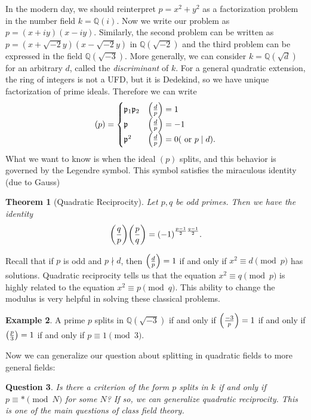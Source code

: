 \documentclass[leqno, openany]{memoir}
\newtheorem{thm}{Theorem}[section]
\newtheorem{quest}[thm]{Question}
\theoremstyle{definition}
\newtheorem{exm}[thm]{Example}
\theoremstyle{remark}
\theoremstyle{plain}
\theoremstyle{definition}
\theoremstyle{remark}
\newcommand{\Q}{\mathbb{Q}}
\newcommand{\mf}[1]{\mathfrak{#1}}
\begin{document}
In the modern day, we should reinterpret $p = x^2 + y^2$ as a factorization
problem in the number field $k = \Q(i)$. Now we write our problem as $p =
(x+iy)(x-iy)$. Similarly, the second problem can be written as $p = (x +
\sqrt{-2} y)(x - \sqrt{-2} y)$ in $\Q(\sqrt{-2})$ and the third problem can be
expressed in the field $\Q(\sqrt{-3})$. More generally, we can consider $k =
\Q(\sqrt{d})$ for an arbitrary $d$, called the \textit{discriminant} of $k$.
For a general quadratic extension, the ring of integers is not a UFD, but it is
Dedekind, so we have unique factorization of prime ideals. Therefore we can
write \[ (p) = \begin{cases} \mf{p}_1 \mf{p}_2 & \qty(\frac{d}{p}) = 1 \\
\mf{p} & \qty(\frac{d}{p}) = -1 \\ \mf{p}^2 & \qty(\frac{d}{p}) = 0 (\text{ or
} p \mid d).  \end{cases} \] What we want to know is when the ideal $(p)$
splits, and this behavior is governed by the Legendre symbol. This symbol
satisfies the miraculous identity (due to Gauss)

\begin{thm}[Quadratic Reciprocity] Let $p,q$ be odd primes. Then we have the
    identity \[ \qty(\frac{q}{p}) \qty(\frac{p}{q}) = {(-1)}^{\frac{p-1}{2}
    \frac{q-1}{2}}. \] \end{thm}

Recall that if $p$ is odd and $p \nmid d$, then $\qty(\frac{d}{p}) = 1$ if and
only if $x^2 \equiv d \pmod p$ has solutions. Quadratic reciprocity tells us
that the equation $x^2 \equiv q \pmod p$ is highly related to the equation $x^2
\equiv p \pmod q$. This ability to change the modulus is very helpful in
solving these classical problems.

\begin{exm} A prime $p$ splits in $\Q(\sqrt{-3})$ if and only if
$\qty(\frac{-3}{p}) = 1$ if and only if $\qty(\frac{p}{3}) = 1$ if and only if
$p \equiv 1 \pmod 3$.  \end{exm}

Now we can generalize our question about splitting in quadratic fields to more
general fields:

\begin{quest} Is there a criterion of the form $p$ splits in $k$ if and only if
$p \equiv * \pmod N$ for some $N$? If so, we can generalize quadratic
reciprocity. This is one of the main questions of class field theory.
\end{quest}
\end{document}
